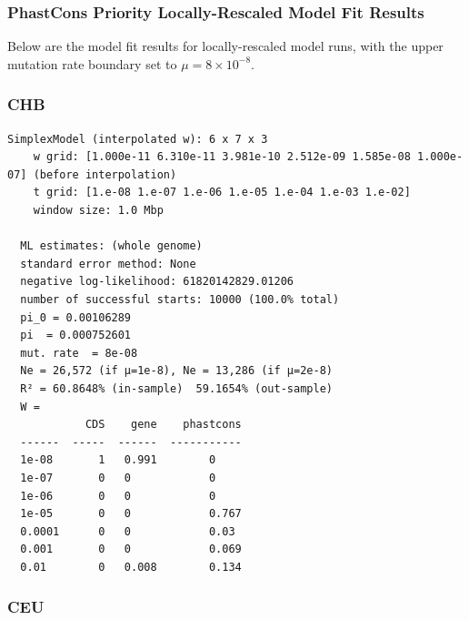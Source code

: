\documentclass[11pt]{article}
\begin{document}
\clearpage

\subsubsection{PhastCons Priority Locally-Rescaled Model Fit Results}

Below are the model fit results for locally-rescaled model runs, with the
upper mutation rate boundary set to $\mu = 8 \times 10^{-8}$.

\subsubsection*{CHB}

\begin{minipage}{\linewidth}\begin{footnotesize}
\begin{verbatim}
SimplexModel (interpolated w): 6 x 7 x 3
    w grid: [1.000e-11 6.310e-11 3.981e-10 2.512e-09 1.585e-08 1.000e-07] (before interpolation)
    t grid: [1.e-08 1.e-07 1.e-06 1.e-05 1.e-04 1.e-03 1.e-02]
    window size: 1.0 Mbp
  
  ML estimates: (whole genome)
  standard error method: None
  negative log-likelihood: 61820142829.01206
  number of successful starts: 10000 (100.0% total)
  pi_0 = 0.00106289
  pi  = 0.000752601
  mut. rate  = 8e-08 
  Ne = 26,572 (if μ=1e-8), Ne = 13,286 (if μ=2e-8)
  R² = 60.8648% (in-sample)  59.1654% (out-sample)
  W = 
            CDS    gene    phastcons
  ------  -----  ------  -----------
  1e-08       1   0.991        0
  1e-07       0   0            0
  1e-06       0   0            0
  1e-05       0   0            0.767
  0.0001      0   0            0.03
  0.001       0   0            0.069
  0.01        0   0.008        0.134
\end{verbatim}
\end{footnotesize}\end{minipage}

\subsubsection*{CEU}
\end{document}
